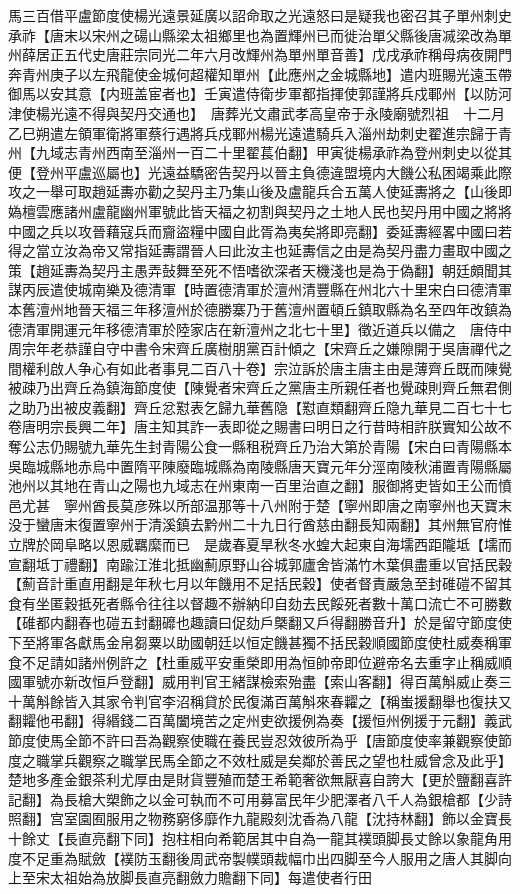 馬三百借平盧節度使楊光遠景延廣以詔命取之光遠怒曰是疑我也密召其子單州刺史承祚【唐末以宋州之碭山縣梁太祖鄉里也為置輝州已而徙治單父縣後唐㓕梁改為單州薛居正五代史唐莊宗同光二年六月改輝州為單州單音善】戊戌承祚稱母病夜開門奔青州庚子以左飛龍使金城何超權知單州【此應州之金城縣地】遣内班賜光遠玉帶御馬以安其意【内班盖宦者也】壬寅遣侍衛步軍都指揮使郭謹將兵戍鄆州【以防河津使楊光遠不得與契丹交通也】　唐葬光文肅武孝高皇帝于永陵廟號烈祖　十二月乙巳朔遣左領軍衛將軍蔡行遇將兵戍鄆州楊光遠遣騎兵入淄州劫刺史翟進宗歸于青州【九域志青州西南至淄州一百二十里翟萇伯翻】甲寅徙楊承祚為登州刺史以從其便【登州平盧巡屬也】光遠益驕密告契丹以晉主負德違盟境内大饑公私困竭乘此際攻之一舉可取趙延夀亦勸之契丹主乃集山後及盧龍兵合五萬人使延夀將之【山後即媯檀雲應諸州盧龍幽州軍號此皆天福之初割與契丹之土地人民也契丹用中國之將將中國之兵以攻晉藉寇兵而齎盜糧中國自此胥為夷矣將即亮翻】委延夀經畧中國曰若得之當立汝為帝又常指延夀謂晉人曰此汝主也延夀信之由是為契丹盡力畫取中國之策【趙延夀為契丹主愚弄鼔舞至死不悟嗜欲深者天機淺也是為于偽翻】朝廷頗聞其謀丙辰遣使城南樂及德清軍【時置德清軍於澶州清豐縣在州北六十里宋白曰德清軍本舊澶州地晉天福三年移澶州於德勝寨乃于舊澶州置頓丘鎮取縣為名至四年改鎮為德清軍開運元年移德清軍於陸家店在新澶州之北七十里】徵近道兵以備之　唐侍中周宗年老恭謹自守中書令宋齊丘廣樹朋黨百計傾之【宋齊丘之嫌隙開于吳唐禪代之間權利啟人争心有如此者事見二百八十卷】宗泣訴於唐主唐主由是薄齊丘既而陳覺被疎乃出齊丘為鎮海節度使【陳覺者宋齊丘之黨唐主所親任者也覺疎則齊丘無君側之助乃出被皮義翻】齊丘忿懟表乞歸九華舊隐【懟直類翻齊丘隐九華見二百七十七卷唐明宗長興二年】唐主知其詐一表即從之賜書曰明日之行昔時相許朕實知公故不奪公志仍賜號九華先生封青陽公食一縣租税齊丘乃治大第於青陽【宋白曰青陽縣本吳臨城縣地赤烏中置隋平陳廢臨城縣為南陵縣唐天寶元年分涇南陵秋浦置青陽縣屬池州以其地在青山之陽也九域志在州東南一百里治直之翻】服御將吏皆如王公而憤邑尤甚　寧州酋長莫彦殊以所部温那等十八州附于楚【寧州即唐之南寧州也天寶末没于蠻唐末復置寧州于清溪鎮去黔州二十九日行酋慈由翻長知兩翻】其州無官府惟立牌於岡阜略以恩威羈縻而已　是歲春夏旱秋冬水蝗大起東自海壖西距隴坻【壖而宣翻坻丁禮翻】南踰江淮北抵幽薊原野山谷城郭廬舍皆滿竹木葉俱盡重以官括民穀【薊音計重直用翻是年秋七月以年饑用不足括民穀】使者督責嚴急至封碓磑不留其食有坐匿穀抵死者縣令往往以督趣不辦納印自劾去民餒死者數十萬口流亡不可勝數【碓都内翻舂也磑五封翻䃺也趣讀曰促劾戶槩翻又戶得翻勝音升】於是留守節度使下至將軍各獻馬金帛芻粟以助國朝廷以恒定饑甚獨不括民穀順國節度使杜威奏稱軍食不足請如諸州例許之【杜重威平安重榮即用為恒帥帝即位避帝名去重字止稱威順國軍號亦新改恒戶登翻】威用判官王緒謀檢索殆盡【索山客翻】得百萬斛威止奏三十萬斛餘皆入其家令判官李沼稱貸於民復滿百萬斛來春糶之【稱蚩援翻舉也復扶又翻糶他弔翻】得緡錢二百萬闔境苦之定州吏欲援例為奏【援恒州例援于元翻】義武節度使馬全節不許曰吾為觀察使職在養民豈忍效彼所為乎【唐節度使率兼觀察使節度之職掌兵觀察之職掌民馬全節之不效杜威是矣鄰於善民之望也杜威曾念及此乎】　楚地多產金銀茶利尤厚由是財貨豐殖而楚王希範奢欲無厭喜自誇大【更於鹽翻喜許記翻】為長槍大槊飾之以金可執而不可用募富民年少肥澤者八千人為銀槍都【少詩照翻】宫室園囿服用之物務窮侈靡作九龍殿刻沈香為八龍【沈持林翻】飾以金寶長十餘丈【長直亮翻下同】抱柱相向希範居其中自為一龍其襆頭脚長丈餘以象龍角用度不足重為賦斂【襆防玉翻後周武帝製幞頭裁幅巾出四脚至今人服用之唐人其脚向上至宋太祖始為放脚長直亮翻斂力贍翻下同】每遣使者行田